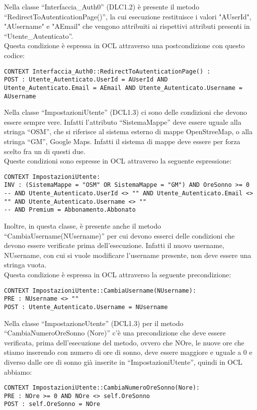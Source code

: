 \begin{listaPersonale}[OCL]{}
    Nella classe “Interfaccia\_Auth0” (DLC1.2) è presente il metodo “RedirectToAutenticationPage()”, la cui esecuzione restituisce i valori "AUserId", "AUsername" e "AEmail" che vengono attribuiti ai rispettivi attributi presenti in “Utente\_Autenticato”. \\
    Questa condizione è espressa in OCL attraverso una postcondizione con questo codice: 
    \begin{lstlisting}
CONTEXT Interfaccia_Auth0::RedirectToAutenticationPage() :
POST : Utente_Autenticato.UserId = AUserId AND Utente_Autenticato.Email = AEmail AND Utente_Autenticato.Username = AUsername
    \end{lstlisting}




    Nella classe “ImpostazioniUtente” (DCL1.3) ci sono delle condizioni che devono essere sempre vere. Infatti l’attributo “SistemaMappe” deve essere uguale alla stringa “OSM”, che si riferisce al sistema esterno di mappe OpenStreeMap, o alla stringa “GM”, Google Maps. Infatti il sistema di mappe deve essere per forza scelto fra un di questi due. \\ 
    Queste condizioni sono espresse in OCL attraverso la seguente espressione:
    \begin{lstlisting}
CONTEXT ImpostazioniUtente:
INV : (SistemaMappe = "OSM" OR SistemaMappe = "GM") AND OreSonno >= 0 
-- AND Utente_Autenticato.UserId <> "" AND Utente_Autenticato.Email <> "" AND Utente_Autenticato.Username <> ""
-- AND Premium = Abbonamento.Abbonato
    \end{lstlisting}
    Inoltre, in questa classe, è presente anche il metodo “CambiaUsername(NUsername)” per cui devono esserci delle condizioni che devono essere verificate prima dell’esecuzione. Infatti il nuovo username, NUsername, con cui si vuole modificare l’username presente, non deve essere una stringa vuota. \\ 
    Questa condizione è espressa in OCL attraverso la seguente precondizione:
    \begin{lstlisting}
CONTEXT ImpostazioniUtente::CambiaUsername(NUsername):
PRE : NUsername <> ""
POST : Utente_Autenticato.Username = NUsername
    \end{lstlisting}
    Nella classe “ImpostazioneUtente” (DCL1.3) per il metodo “CambiaNumeroOreSonno (Nore)” c’è una precondizione che deve essere verificata, prima dell’esecuzione del metodo, ovvero che NOre, le nuove ore che stiamo inserendo con numero di ore di sonno, deve essere maggiore e uguale a 0 e diverso dalle ore di sonno già inserite in “ImpostazioniUtente”, quindi in OCL abbiamo:
    \begin{lstlisting} 
CONTEXT ImpostazioniUtente::CambiaNumeroOreSonno(Nore):
PRE : NOre >= 0 AND NOre <> self.OreSonno
POST : self.OreSonno = NOre
     

\end{lstlisting}
\end{listaPersonale}
